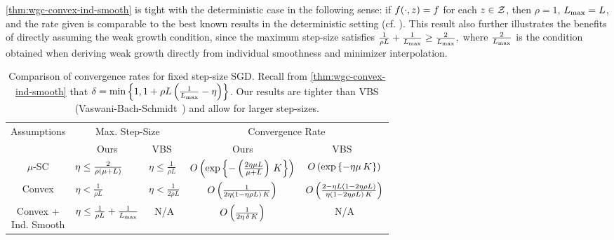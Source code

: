 \autoref{thm:wgc-convex-ind-smooth} is tight with the deterministic case in the following sense: if \( f(\cdot, z) = f \) for each \( z \in \mathcal{Z} \), then \( \rho = 1 \), \( L_{\text{max}} = L \), and the rate given is comparable to the best known results in the deterministic setting (cf. \citet[Theorem 3.3]{bubeck2015convex}). 
This result also further illustrates the benefits of directly assuming the weak growth condition, since the maximum step-size satisfies 
\( \frac{1}{\rho L} + \frac{1}{L_{\text{max}}} \geq \frac{2}{L_{\text{max}}}, \)
where \( \frac{2}{L_{\text{max}}} \) is the condition obtained when deriving weak growth directly from individual smoothness and minimizer interpolation.
\begin{table}[t]
    \centering
    \begin{tabular}{c l l c c  }\toprule
        \multirow{2}{*}{Assumptions} & \multicolumn{2}{c}{Max. Step-Size}  & \multicolumn{2}{c}{Convergence Rate}\\%
        \cmidrule(lr){2-3} \cmidrule(l){4-5}
                 & \multicolumn{1}{c}{Ours} & \multicolumn{1}{c}{VBS~\citep{vaswani2019fast}} & \multicolumn{1}{c}{Ours} & \multicolumn{1}{c}{VBS~\citep{vaswani2019fast}}\\ \midrule
    \( \mu \)-SC & \( \eta \leq \frac{2}{\rho\left(\mu + L\right)} \)%
                 & \( \eta \leq \frac{1}{\rho L} \)%
                 & \( O\left(\exp\left\{- \left(\frac{2 \eta \mu L}{\mu + L}\right) \, K\right\}\right) \)%
                 & \( O\left(\exp\left\{- \eta \mu \, K \right\}\right) \) \\ \addlinespace
    Convex       & \( \eta < \frac{1}{\rho L} \)%
                 & \( \eta < \frac{1}{2 \rho L} \)%
                 & \( O\left(\frac{1}{2 \eta (1 - \eta \rho L) \, K}\right) \)%
                 & \( O\left(\frac{2 - \eta L\left(1 - 2 \eta \rho L\right)}{\eta (1- 2 \eta \rho L) \, K} \right) \)\\ \addlinespace 
    \makecell{Convex + \\ Ind. Smooth}%
                 & \( \eta \leq \frac{1}{\rho L} + \frac{1}{L_{\text{max}}} \)%
                 & \multicolumn{1}{c}{N/A}%
                 & \( O\left(\frac{1}{2 \eta \, \delta \, K}\right) \)%
                 & \multicolumn{1}{c}{N/A} \\ \bottomrule 
    \end{tabular}
    \caption{Comparison of convergence rates for fixed step-size \ac{SGD}. Recall from \autoref{thm:wgc-convex-ind-smooth} that \( \delta = \min \left\{ 1, 1 + \rho L \left(\frac{1}{L_{\text{max}}} - \eta \right)\right\} \). Our results are tighter than VBS (Vaswani-Bach-Schmidt~\citep{vaswani2019fast}) and allow for larger step-sizes.}%
    \label{table:sgd-comparison}
\end{table}


